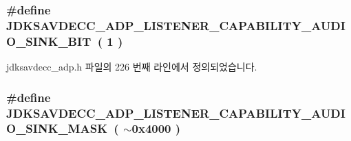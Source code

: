 \subsubsection[{\texorpdfstring{J\+D\+K\+S\+A\+V\+D\+E\+C\+C\+\_\+\+A\+D\+P\+\_\+\+L\+I\+S\+T\+E\+N\+E\+R\+\_\+\+C\+A\+P\+A\+B\+I\+L\+I\+T\+Y\+\_\+\+A\+U\+D\+I\+O\+\_\+\+S\+I\+N\+K\+\_\+\+B\+IT}{JDKSAVDECC_ADP_LISTENER_CAPABILITY_AUDIO_SINK_BIT}}]{\setlength{\rightskip}{0pt plus 5cm}\#define J\+D\+K\+S\+A\+V\+D\+E\+C\+C\+\_\+\+A\+D\+P\+\_\+\+L\+I\+S\+T\+E\+N\+E\+R\+\_\+\+C\+A\+P\+A\+B\+I\+L\+I\+T\+Y\+\_\+\+A\+U\+D\+I\+O\+\_\+\+S\+I\+N\+K\+\_\+\+B\+IT~( 1 )}\hypertarget{group__adp__listener__capability_ga1465f1039a92965fb8b3d052ef59d7e9}{}\label{group__adp__listener__capability_ga1465f1039a92965fb8b3d052ef59d7e9}


jdksavdecc\+\_\+adp.\+h 파일의 226 번째 라인에서 정의되었습니다.

\subsubsection[{\texorpdfstring{J\+D\+K\+S\+A\+V\+D\+E\+C\+C\+\_\+\+A\+D\+P\+\_\+\+L\+I\+S\+T\+E\+N\+E\+R\+\_\+\+C\+A\+P\+A\+B\+I\+L\+I\+T\+Y\+\_\+\+A\+U\+D\+I\+O\+\_\+\+S\+I\+N\+K\+\_\+\+M\+A\+SK}{JDKSAVDECC_ADP_LISTENER_CAPABILITY_AUDIO_SINK_MASK}}]{\setlength{\rightskip}{0pt plus 5cm}\#define J\+D\+K\+S\+A\+V\+D\+E\+C\+C\+\_\+\+A\+D\+P\+\_\+\+L\+I\+S\+T\+E\+N\+E\+R\+\_\+\+C\+A\+P\+A\+B\+I\+L\+I\+T\+Y\+\_\+\+A\+U\+D\+I\+O\+\_\+\+S\+I\+N\+K\+\_\+\+M\+A\+SK~( $\sim$0x4000 )}\hypertarget{group__adp__listener__capability_gaa2123d2e970ed020f4c9cd5effaf9799}{}\label{group__adp__listener__capability_gaa2123d2e970ed020f4c9cd5effaf9799}



